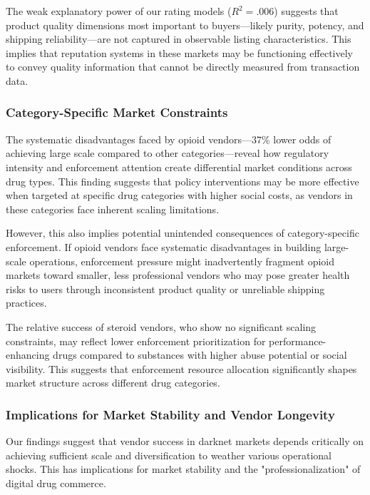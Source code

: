 \documentclass{article}
\begin{document}
The weak explanatory power of our rating models ($R^2 = .006$) suggests that product quality dimensions most important to buyers—likely purity, potency, and shipping reliability—are not captured in observable listing characteristics. This implies that reputation systems in these markets may be functioning effectively to convey quality information that cannot be directly measured from transaction data.

\subsubsection{Category-Specific Market Constraints}

The systematic disadvantages faced by opioid vendors—37\% lower odds of achieving large scale compared to other categories—reveal how regulatory intensity and enforcement attention create differential market conditions across drug types. This finding suggests that policy interventions may be more effective when targeted at specific drug categories with higher social costs, as vendors in these categories face inherent scaling limitations.

However, this also implies potential unintended consequences of category-specific enforcement. If opioid vendors face systematic disadvantages in building large-scale operations, enforcement pressure might inadvertently fragment opioid markets toward smaller, less professional vendors who may pose greater health risks to users through inconsistent product quality or unreliable shipping practices.

The relative success of steroid vendors, who show no significant scaling constraints, may reflect lower enforcement prioritization for performance-enhancing drugs compared to substances with higher abuse potential or social visibility. This suggests that enforcement resource allocation significantly shapes market structure across different drug categories.

\subsubsection{Implications for Market Stability and Vendor Longevity}

Our findings suggest that vendor success in darknet markets depends critically on achieving sufficient scale and diversification to weather various operational shocks. This has implications for market stability and the "professionalization" of digital drug commerce.
\end{document}
